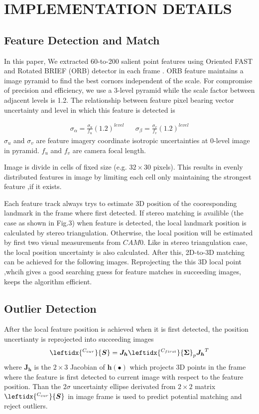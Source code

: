 \documentclass[a4paper, 10pt, conference]{ieeeconf}      %
\begin{document}
\section{IMPLEMENTATION DETAILS}
\subsection{Feature Detection and Match}
In this paper, We extracted 60-to-200 salient point features  using Oriented FAST and Rotated BRIEF (ORB) detector in each frame \cite{rublee2011orb}. ORB feature maintains a image pyramid to find the best cornors independent of the scale. For  compromise of precision and efficiency, we use a 3-level pyramid while the scale factor between adjacent levels is 1.2. The relationship between feature pixel bearing vector uncertainty and level in which this feature is detected is 

\begin{eqnarray}
\sigma_{\alpha} = \frac{\sigma_u}{f_u} \left(1.2 \right)^{level} &&
\sigma_{\beta} = \frac{\sigma_v}{f_v} \left(1.2 \right)^{level} 
\end{eqnarray}
 $ \sigma_u $   and ${\sigma_v}$ are  feature imagery coordinate isotropic uncertainties at 0-level image in pyramid. $f_u $ and  $f_v$ are camera focal length.
 
 Image is divide in cells of fixed size (e.g. $ 32 \times 30$ pixels). This results in evenly distributed features in image by limiting each cell only maintaining the strongest feature ,if it exists. 

Each feature track always trys to estimate 3D position of the cooresponding landmark in the  frame where  first detected. If stereo matching is availible (the case as shown in Fig.3) when feature is detected, the local landmark position is calculated by stereo triangulation. Otherwise, the local position will be estimated by first two visual measurements from $CAM0$. Like in stereo triangulation case, the local position uncertainty is also calculated. After this, 2D-to-3D matching can be achieved for the following images. Reprojecting the this 3D local point ,whcih  gives a good searching guess for  feature matches in succeeding images, keeps the algorithm efficient. 
\subsection{Outlier Detection}
After the local feature position is achieved when it is first detected, the position uncertianty is reprojected into succeeding images 
\begin{equation}
\leftidx{^{C_{cur}}}{\bm { S}} = {\bm J_{\bm h}} \leftidx{^{C_{first}}}{\bm { \Sigma}}_{p}{\bm J_{\bm h}}^T
\end{equation}
where $ {\bm J_{\bm h}}$ is the $ 2 \times 3$ Jacobian of $ \bm h( \bullet )$ which projects 3D points in the frame where the feature is first detected to current image with respect to the feature position. Than the $ 2\sigma$ uncertainty ellipse derivated from $ 2 \times2$ matrix $\leftidx{^{C_{cur}}}{\bm { S}} $  in image frame is  used to predict potential matching and reject outliers.
\end{document}
